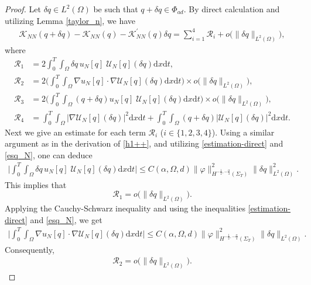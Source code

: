 \documentclass[a4paper,12pt,reqno,natbib]{amsart}
\newcommand{\dx} {\displaystyle\mathrm{d}x}
\newcommand{\dt} {\displaystyle\mathrm{d}t}
\begin{document}
\begin{proof}
Let $\delta q\in L^2(\Omega)$ be such that $q+\delta q \in \Phi_{ad}$. By direct calculation and utilizing Lemma \ref{taylor_n}, we have
\begin{align}\label{as-rr}
    \mathcal{K}_{NN}(q+\delta q) -\mathcal{K}_{NN}(q)- \mathcal{K}_{NN}^{\prime}(q)\delta q=\sum_{i=1}^4\mathcal{R}_i+o\Big(\|\delta q\|_{L^2(\Omega)}\Big),
\end{align}
where
\begin{align*}
\mathcal{R}_1&=2\int_0^T\int_\Omega \delta q\,u_N[q]\; \mathcal{U}_N[q](\delta q)\dx\dt, \\
\mathcal{R}_2&= 2\Big(\int_0^T\int_\Omega\nabla u_N[q]\cdot\nabla \mathcal{U}_N[q](\delta q)\dx\dt\Big)\times o\Big(\|\delta q\|_{L^2(\Omega)}\Big), \\
\mathcal{R}_3&= 2\Big(\int_0^T\int_\Omega (q+\delta q)u_N[q]\; \mathcal{U}_N[q](\delta q)\dx\dt\Big)\times o\Big(\|\delta q\|_{L^2(\Omega)}\Big), \\
\mathcal{R}_4&= \int_0^T\int_\Omega\Big|\nabla \mathcal{U}_N[q](\delta q)\Big|^2\dx\dt + \int_0^T\int_{\Omega}(q+\delta q)\Big| \mathcal{U}_N[q](\delta q)\Big|^2 \dx \dt.
\end{align*}
Next we give an estimate for each term $\mathcal{R}_i$ ($i\in\{1,2,3,4\}$). Using a similar argument as in the derivation of \eqref{h1++}, and utilizing \eqref{estimation-direct} and \eqref{esq_N}, one can deduce
\begin{align*}
\Big|\int_0^T\int_\Omega \delta q\,  u_N[q]\; \mathcal{U}_N[q](\delta q)\dx\dt\Big| \leq C(\alpha,\Omega,d)\|\varphi\|_{H^{-\frac{1}{2}, - \frac{\alpha}{4} }(\Sigma_T)}^2\|\delta q\|_{L^2(\Omega)}^2.
\end{align*}
This implies that 
\begin{equation}\label{r10}
    \mathcal{R}_1=o\Big(\|\delta q\|_{L^2(\Omega)}\Big).
\end{equation}
Applying the Cauchy-Schwarz inequality and using the inequalities \eqref{estimation-direct} and \eqref{esq_N}, we get
\begin{align}\label{similar}
\Big|\int_0^T\int_\Omega\nabla u_N[q]\cdot\nabla \mathcal{U}_N[q](\delta q)\dx\dt\Big| \leq C(\alpha,\Omega,d)\|\varphi\|_{H^{-\frac{1}{2}, - \frac{\alpha}{4} }(\Sigma_T)}^2\|\delta q\|_{L^2(\Omega)}.
\end{align}
Consequently, 
\begin{align} \label{c_0}
     \mathcal{R}_2= o\Big(\|\delta q\|_{L^2(\Omega)}\Big).
\end{align}



\end{proof}
\end{document}
